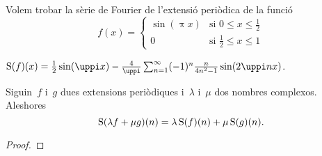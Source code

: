 \documentclass[../../main.tex]{subfiles}
\begin{document}
    \begin{example}
        \label{ex:trobar una sèrie de Fourier}
        Volem trobar la sèrie de Fourier de l'extensió periòdica de la funció
        \[f(x)=\begin{cases}
            \sin(\uppi x) & \text{si } 0\leq x\leq\frac{1}{2} \\
            0 & \text{si }\frac{1}{2}\leq x\leq 1
        \end{cases}\]
        \begin{solution}
            \(\sfourier(f)(x)=\frac{1}{2}\sin(\uppi x)-\frac{4}{\uppi}\sum_{n=1}^{\infty}(-1)^{n}\frac{n}{4n^{2}-1}\sin(2\uppi nx)\).
        \end{solution}
    \end{example}
    \begin{proposition}
        \label{prop:les sèries de Fourier són lineals}
        Siguin~\(f\) i~\(g\) dues extensions periòdiques i~\(\lambda\) i~\(\mu\) dos nombres complexos.
        Aleshores
        \[
            \operatorname{S}(\lambda f+\mu g)(n)=\lambda\operatorname{S}(f)(n)+\mu\operatorname{S}(g)(n).
        \]
        \begin{proof}
        \end{proof}
    \end{proposition}
\end{document}
